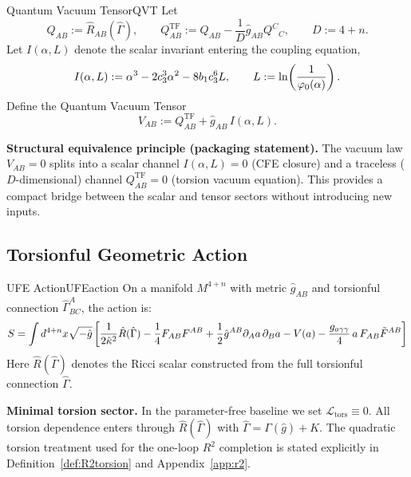 \begin{definition}{Quantum Vacuum Tensor}{QVT}
Let
\begin{equation}
Q_{AB} := \hat{R}_{AB}(\hat{\Gamma}),
\qquad
Q^{\mathrm{TF}}_{AB} := Q_{AB} - \frac{1}{D}\hat{g}_{AB} Q^{C}{}_{C},
\qquad D:=4+n.
\end{equation}
Let $I(\alpha,L)$ denote the scalar invariant entering the coupling equation,
\begin{equation}
I(\alpha,L) := \alpha^3 - 2c_3^3\alpha^2 - 8 b_1 c_3^6 L,
\qquad L := \ln\!\left(\frac{1}{\varphi_0(\alpha)}\right).
\end{equation}
Define the Quantum Vacuum Tensor
\begin{equation}
V_{AB} := Q^{\mathrm{TF}}_{AB} + \hat{g}_{AB}\, I(\alpha,L).
\end{equation}

\tcblower
\textbf{Structural equivalence principle (packaging statement).}
The vacuum law $V_{AB}=0$ splits into a scalar channel $I(\alpha,L)=0$ (CFE closure)
and a traceless ($D$-dimensional) channel $Q^{\mathrm{TF}}_{AB}=0$ (torsion vacuum equation).
This provides a compact bridge between the scalar and tensor sectors without introducing new inputs.
\end{definition}

\subsection{Torsionful Geometric Action}

\begin{definition}{UFE Action}{UFEaction}
On a manifold $M^{4+n}$ with metric $\hat{g}_{AB}$ and torsionful connection 
$\hat{\Gamma}^A_{BC}$, the action is:
\begin{equation}
    S = \int d^{4+n}x\sqrt{-\hat{g}}\left[
        \frac{1}{2\hat{\kappa}^2}\hat{R}(\hat{\Gamma}) 
        - \frac{1}{4}F_{AB}F^{AB}
        + \frac{1}{2}\hat{g}^{AB}\partial_A a\,\partial_B a 
        - V(a) 
        - \frac{g_{a\gamma\gamma}}{4}\, a\, F_{AB}\tilde{F}^{AB}
    \right]
\end{equation}
Here $\hat{R}(\hat{\Gamma})$ denotes the Ricci scalar constructed from the full torsionful connection $\hat{\Gamma}$.
\end{definition}

\noindent\textbf{Minimal torsion sector.} In the parameter-free baseline we set $\mathcal{L}_{\mathrm{tors}}\equiv 0$.
All torsion dependence enters through $\hat{R}(\hat{\Gamma})$ with $\hat{\Gamma}=\Gamma(\hat{g})+K$.
The quadratic torsion treatment used for the one-loop $R^2$ completion is stated explicitly in Definition~\ref{def:R2torsion} and Appendix~\ref{app:r2}.

